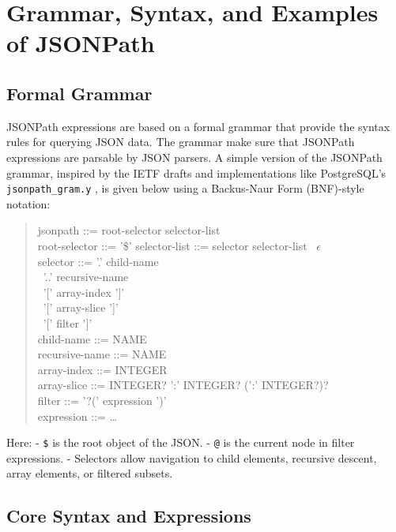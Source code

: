 \chapter{Grammar, Syntax, and Examples of JSONPath}

\section{Formal Grammar}

JSONPath expressions are based on a formal grammar that provide the syntax rules for querying JSON data. The grammar make sure that JSONPath expressions are parsable by JSON parsers.  
A simple version of the JSONPath grammar, inspired by the IETF drafts \cite{ietf_jsonpath_draft, ietf_rfc9535} and implementations like PostgreSQL’s \texttt{jsonpath\_gram.y} \cite{postgres_jsonpath}, is given below using a Backus-Naur Form (BNF)-style notation:

\begin{quote}
	\begin{tabbing}
		jsonpath       ::= root-selector selector-list \\
		root-selector  ::= '\$' 
		selector-list  ::= selector selector-list \textbar\ $\epsilon$ \\
		selector       ::= '.' child-name \\
		\quad \textbar\ '..' recursive-name \\
		\quad \textbar\ '[' array-index ']' \\
		\quad \textbar\ '[' array-slice ']' \\
		\quad \textbar\ '[' filter ']' \\
		child-name     ::= NAME \\
		recursive-name ::= NAME \\
		array-index    ::= INTEGER \\
		array-slice    ::= INTEGER? ':' INTEGER? (':' INTEGER?)? \\
		filter         ::= '?(' expression ')' \\
		expression     ::= \dots
	\end{tabbing}
\end{quote}

Here:  
- \texttt{\$} is the root object of the JSON.  
- \texttt{@} is the current node in filter expressions.  
- Selectors allow navigation to child elements, recursive descent, array elements, or filtered subsets.

\section{Core Syntax and Expressions}

